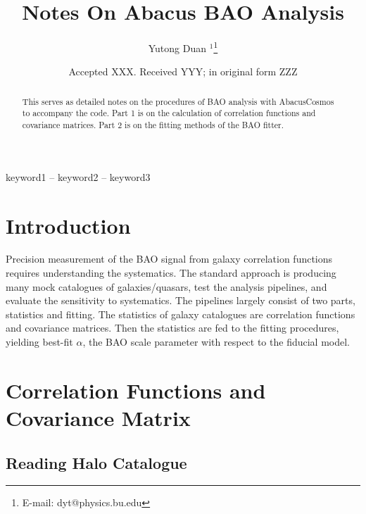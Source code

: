\documentclass[fleqn,usenatbib]{mnras}
\title{Notes On Abacus BAO Analysis}
\author[YT. Duan et al.]{
Yutong Duan $^{1}$\thanks{E-mail: dyt@physics.bu.edu}
\\
}
\date{Accepted XXX. Received YYY; in original form ZZZ}
\begin{document}
\label{firstpage}
\pagerange{\pageref{firstpage}--\pageref{lastpage}}
\maketitle

\begin{abstract}
This serves as detailed notes on the procedures of BAO analysis with AbacusCosmos to accompany the code. Part 1 is on the calculation of correlation functions and covariance matrices. Part 2 is on the fitting methods of the BAO fitter.
\end{abstract}

\begin{keywords}
keyword1 -- keyword2 -- keyword3
\end{keywords}



\section{Introduction}

Precision measurement of the BAO signal from galaxy correlation functions requires understanding the systematics. The standard approach is producing many mock catalogues of galaxies/quasars, test the analysis pipelines, and evaluate the sensitivity to systematics. The pipelines largely consist of two parts, statistics and fitting. The statistics of galaxy catalogues are correlation functions and covariance matrices. Then the statistics are fed to the fitting procedures, yielding best-fit $\alpha$, the BAO scale parameter with respect to the fiducial model.

\section{Correlation Functions and Covariance Matrix}

	\subsection{Reading Halo Catalogue}
		
\end{document}
